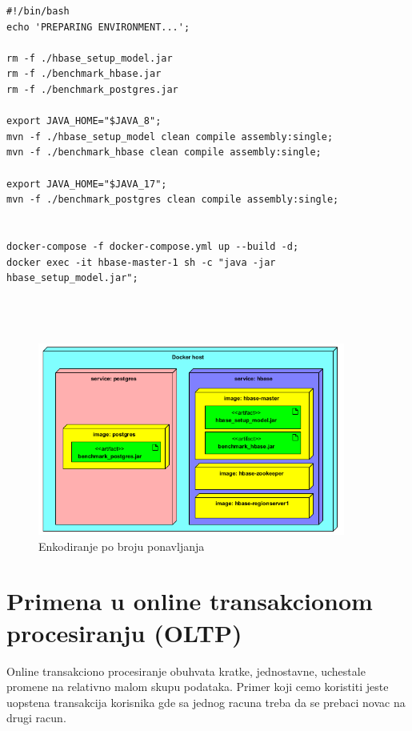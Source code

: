 \documentclass[12pt,oneside]{memoir}
\begin{document}

\begin{lstlisting}[title={prepareEnv.sh},captionpos=t]
#!/bin/bash
echo 'PREPARING ENVIRONMENT...';

rm -f ./hbase_setup_model.jar
rm -f ./benchmark_hbase.jar
rm -f ./benchmark_postgres.jar

export JAVA_HOME="$JAVA_8";
mvn -f ./hbase_setup_model clean compile assembly:single;
mvn -f ./benchmark_hbase clean compile assembly:single;

export JAVA_HOME="$JAVA_17";
mvn -f ./benchmark_postgres clean compile assembly:single;


docker-compose -f docker-compose.yml up --build -d;
docker exec -it hbase-master-1 sh -c "java -jar hbase_setup_model.jar";




\end{lstlisting}

\begin{figure}[!ht]
  \centering
  \includegraphics[width=0.9\textwidth]{deployment_diagram.png}
  \caption{Enkodiranje po broju ponavljanja}
  \label{fig:grafikon}
\end{figure}

\pagebreak

\section{Primena u online transakcionom procesiranju (OLTP)}

Online transakciono procesiranje obuhvata kratke, jednostavne, uchestale promene  na relativno malom skupu podataka. Primer koji cemo koristiti jeste uopstena transakcija korisnika gde sa jednog racuna treba da se prebaci novac na drugi racun.
\end{document}
